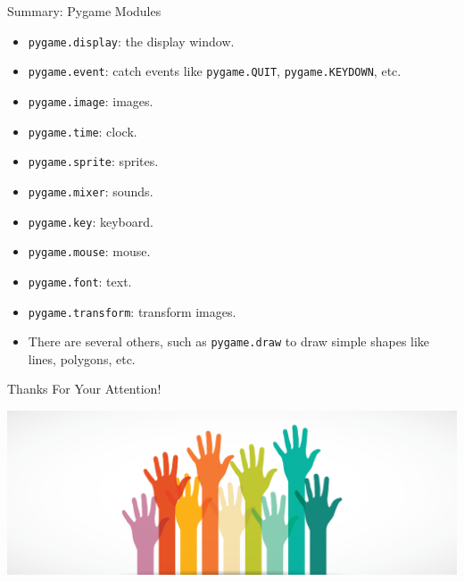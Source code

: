 \documentclass[aspectratio=169]{beamer}
\begin{document}
\begin{frame}[fragile]{Summary: Pygame Modules}

\begin{itemize}
\item \verb|pygame.display|: the display window.
\item \verb|pygame.event|: catch events like \verb|pygame.QUIT|, \verb|pygame.KEYDOWN|, etc.
\item \verb|pygame.image|: images.
\item \verb|pygame.time|: clock.
\item \verb|pygame.sprite|: sprites.
\item \verb|pygame.mixer|: sounds.
\item \verb|pygame.key|: keyboard.
\item \verb|pygame.mouse|: mouse.
\item \verb|pygame.font|: text.
\item \verb|pygame.transform|: transform images.
\item There are several others, such as \verb|pygame.draw| to draw simple shapes like lines, polygons, etc.
\end{itemize}
\end{frame}

\begin{frame}{Thanks For Your Attention!}
\begin{center}	
\includegraphics[width=14cm]{image_conclu03}
\end{center}	
\end{frame}

\begin{frame}
\end{frame}
\end{document}
